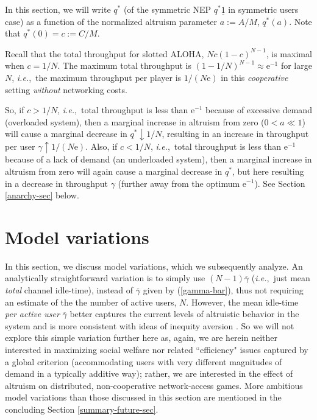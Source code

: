 \documentclass[12pt,onecolumn,draftcls]{IEEEtran}
\newcommand{\qstar}{{q^*}}
\newcommand{\ie}{{\em i.e.},~}
\newcommand{\uone}{\underline{1}}
\newcommand{\e}{\mbox{e}}
\begin{document}
In this section, we will write $\qstar$ (of the symmetric NEP $\qstar\uone$
in symmetric  users case) as a function of the normalized altruism
parameter $a:=A/M$, $\qstar(a)$.  Note that $\qstar(0)=c:=C/M$.  

Recall that the total throughput for slotted ALOHA, $Nc(1-c)^{N-1}$, is
maximal when $c=1/N$. The maximum total throughput is $(1-1/N)^{N-1}
\approx \e^{-1}$ for large $N$, \ie the maximum throughput per player is
$1/(N\e)$ in this {\em cooperative} setting {\em without} networking
costs.


So, if $c> 1/N$, \ie total throughput is less than $\e^{-1}$ because of
excessive demand (overloaded system), then a marginal increase in altruism
from zero ($0<a\ll 1$) will  cause a marginal decrease in $\qstar\downarrow
1/N$, resulting in an increase in throughput per user $\gamma \uparrow
1/(N\e)$.  Also, if $c< 1/N$, \ie total throughput is less than $\e^{-1}$
because of a lack of demand (an underloaded system), then a marginal increase
in altruism from zero  will  again cause a marginal decrease in $\qstar$,
but here  resulting in a decrease in throughput $\gamma$ (further away from
the optimum $\e^{-1}$).  See Section \ref{anarchy-sec} below.


\section{Model variations}\label{model-var-sec}

In this section, we discuss model variations, which we subsequently
analyze. An analytically
straightforward variation is to simply  use $(N-1)\overline{\gamma}$
(\ie just mean {\em total} channel idle-time),
instead of $\overline{\gamma}$ 
given by (\ref{gamma-bar}),
thus not requiring an estimate of the
the number of active users, $N$.  However, 
the mean idle-time {\em per active user} $\overline{\gamma}$ 
better captures the current levels of altruistic behavior
in the system and is more
consistent with ideas of inequity aversion \cite{fehr_inequity}.
So we will not explore this simple variation further here as, again,
we are herein neither interested in maximizing social welfare nor related 
``efficiency" issues
captured by a global criterion (accommodating
users with very different magnitudes of demand in a typically
additive way); rather, we are interested
in the effect of altruism on distributed, non-cooperative network-access games.
More ambitious  model variations than those discussed in this 
section  are mentioned in
the concluding Section \ref{summary-future-sec}.
\end{document}
